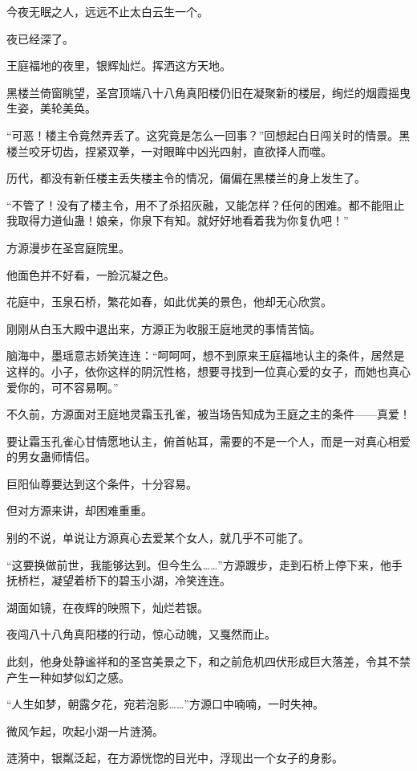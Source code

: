 \begin{this_body}
今夜无眠之人，远远不止太白云生一个。

夜已经深了。

王庭福地的夜里，银辉灿烂。挥洒这方天地。

黑楼兰倚窗眺望，圣宫顶端八十八角真阳楼仍旧在凝聚新的楼层，绚烂的烟霞摇曳生姿，美轮美奂。

“可恶！楼主令竟然弄丢了。这究竟是怎么一回事？”回想起白日闯关时的情景。黑楼兰咬牙切齿，捏紧双拳，一对眼眸中凶光四射，直欲择人而噬。

历代，都没有新任楼主丢失楼主令的情况，偏偏在黑楼兰的身上发生了。

“不管了！没有了楼主令，用不了杀招灰融，又能怎样？任何的困难。都不能阻止我取得力道仙蛊！娘亲，你泉下有知。就好好地看着我为你复仇吧！”

方源漫步在圣宫庭院里。

他面色并不好看，一脸沉凝之色。

花庭中，玉泉石桥，繁花如春，如此优美的景色，他却无心欣赏。

刚刚从白玉大殿中退出来，方源正为收服王庭地灵的事情苦恼。

脑海中，墨瑶意志娇笑连连：“呵呵呵，想不到原来王庭福地认主的条件，居然是这样的。小子，依你这样的阴沉性格，想要寻找到一位真心爱的女子，而她也真心爱你的，可不容易啊。”

不久前，方源面对王庭地灵霜玉孔雀，被当场告知成为王庭之主的条件——真爱！

要让霜玉孔雀心甘情愿地认主，俯首帖耳，需要的不是一个人，而是一对真心相爱的男女蛊师情侣。

巨阳仙尊要达到这个条件，十分容易。

但对方源来讲，却困难重重。

别的不说，单说让方源真心去爱某个女人，就几乎不可能了。

“这要换做前世，我能够达到。但今生么……”方源踱步，走到石桥上停下来，他手抚桥栏，凝望着桥下的碧玉小湖，冷笑连连。

湖面如镜，在夜辉的映照下，灿烂若银。

夜闯八十八角真阳楼的行动，惊心动魄，又戛然而止。

此刻，他身处静谧祥和的圣宫美景之下，和之前危机四伏形成巨大落差，令其不禁产生一种如梦似幻之感。

“人生如梦，朝露夕花，宛若泡影……”方源口中喃喃，一时失神。

微风乍起，吹起小湖一片涟漪。

涟漪中，银粼泛起，在方源恍惚的目光中，浮现出一个女子的身影。


\end{this_body}

